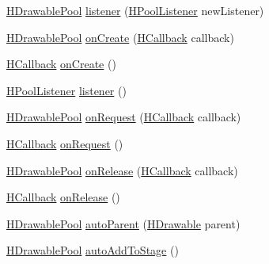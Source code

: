 \begin{DoxyCompactItemize}
\item 
\hyperlink{classhype_1_1util_1_1_h_drawable_pool}{H\-Drawable\-Pool} \hyperlink{classhype_1_1util_1_1_h_drawable_pool_a7491811f484daec00608266d0517bfa3}{listener} (\hyperlink{interfacehype_1_1interfaces_1_1_h_pool_listener}{H\-Pool\-Listener} new\-Listener)
\item 
\hyperlink{classhype_1_1util_1_1_h_drawable_pool}{H\-Drawable\-Pool} \hyperlink{classhype_1_1util_1_1_h_drawable_pool_a86cf06c8fd2891836aacd1ce92d2ab64}{on\-Create} (\hyperlink{interfacehype_1_1interfaces_1_1_h_callback}{H\-Callback} callback)
\item 
\hyperlink{interfacehype_1_1interfaces_1_1_h_callback}{H\-Callback} \hyperlink{classhype_1_1util_1_1_h_drawable_pool_a765d4a466372e5cd7d2834c5f467b604}{on\-Create} ()
\item 
\hyperlink{interfacehype_1_1interfaces_1_1_h_pool_listener}{H\-Pool\-Listener} \hyperlink{classhype_1_1util_1_1_h_drawable_pool_a6537e745ccee369d8f143064f595bea8}{listener} ()
\item 
\hyperlink{classhype_1_1util_1_1_h_drawable_pool}{H\-Drawable\-Pool} \hyperlink{classhype_1_1util_1_1_h_drawable_pool_a3e37f6ee63dbb43b0c18c5d09a0c88dc}{on\-Request} (\hyperlink{interfacehype_1_1interfaces_1_1_h_callback}{H\-Callback} callback)
\item 
\hyperlink{interfacehype_1_1interfaces_1_1_h_callback}{H\-Callback} \hyperlink{classhype_1_1util_1_1_h_drawable_pool_a58a6e5b1f3f71721d5694c5dc4e8140a}{on\-Request} ()
\item 
\hyperlink{classhype_1_1util_1_1_h_drawable_pool}{H\-Drawable\-Pool} \hyperlink{classhype_1_1util_1_1_h_drawable_pool_a41cbee21d2adf201abf31cbe83a881ee}{on\-Release} (\hyperlink{interfacehype_1_1interfaces_1_1_h_callback}{H\-Callback} callback)
\item 
\hyperlink{interfacehype_1_1interfaces_1_1_h_callback}{H\-Callback} \hyperlink{classhype_1_1util_1_1_h_drawable_pool_a2f722e0238c523f02c897c8ea9a27439}{on\-Release} ()
\item 
\hyperlink{classhype_1_1util_1_1_h_drawable_pool}{H\-Drawable\-Pool} \hyperlink{classhype_1_1util_1_1_h_drawable_pool_ad9e475027a0a897cf9cb740fa74fff95}{auto\-Parent} (\hyperlink{classhype_1_1drawable_1_1_h_drawable}{H\-Drawable} parent)
\item 
\hyperlink{classhype_1_1util_1_1_h_drawable_pool}{H\-Drawable\-Pool} \hyperlink{classhype_1_1util_1_1_h_drawable_pool_a0848bd2dfdbbe36e55d80ba4bc842968}{auto\-Add\-To\-Stage} ()
\item 

\end{DoxyCompactItemize}
